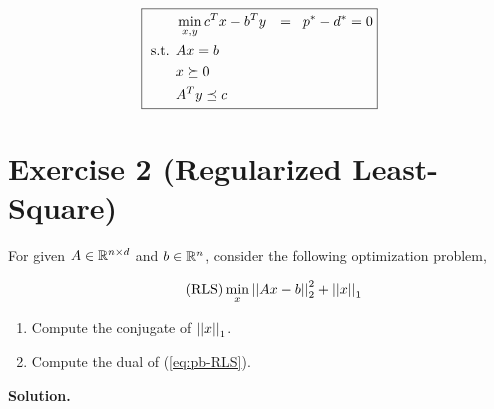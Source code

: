 \documentclass[a4paper, 11pt]{report}
\begin{document}
\begin{enumerate}
\begin{itemize}
    \begin{equation*}
        \boxed{\begin{aligned}
        & \min_{x, y}
        c^{T} x - b^{T} y & = \hspace{.2cm} p^{*} - d^{*} = 0 \\
        \text{ s.t. }
        & A x = b \\
        & x \succeq 0 \\
        & A^{T} y \preceq c
        \end{aligned}}
    \end{equation*}
    \end{itemize}
\end{enumerate}

\pagebreak

\section*{Exercise 2 (Regularized Least-Square)}

For given $A \in \mathbb{R}^{n \times d}$ and $b \in \mathbb{R}^{n}$, consider the following optimization problem,

\begin{equation}
\tag{RLS}
\min_{x} \left|\left| Ax - b \right|\right|_{2}^{2} + \left|\left| x \right|\right|_{1}
\label{eq:pb-RLS}
\end{equation}

\begin{enumerate}
    \item Compute the conjugate of $\left|\left| x \right|\right|_{1}$.
    
    \item Compute the dual of (\ref{eq:pb-RLS}).
\end{enumerate}

\noindent \textbf{Solution.}
\end{document}
